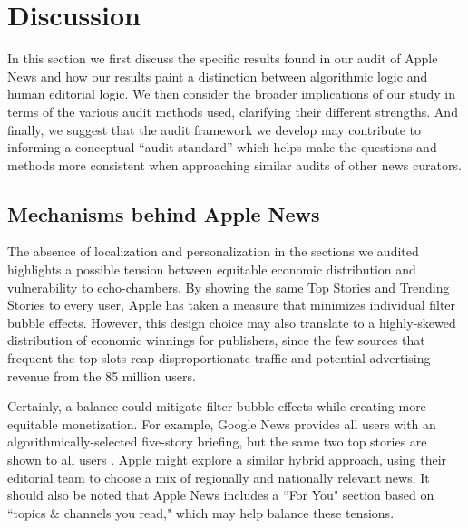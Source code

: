\section{Discussion}\label{sec:discussion}
In this section we first discuss the specific results found in our audit of Apple News and how our results paint a distinction between algorithmic logic and human editorial logic. We then consider the broader implications of our study in terms of the various audit methods used, clarifying their different strengths. And finally, we suggest that the audit framework we develop may contribute to informing a conceptual ``audit standard'' which helps make the questions and methods more consistent when approaching similar audits of other news curators. 


\subsection{Mechanisms behind Apple News}
The absence of localization and personalization in the sections we audited highlights a possible tension between equitable economic distribution and vulnerability to echo-chambers. By showing the same Top Stories and Trending Stories to every user, Apple has taken a measure that minimizes individual filter bubble effects. However, this design choice may also translate to a highly-skewed distribution of economic winnings for publishers, since the few sources that frequent the top slots reap disproportionate traffic and potential advertising revenue from the 85 million users. 

Certainly, a balance could mitigate filter bubble effects while creating more equitable monetization. For example, Google News provides all users with an algorithmically-selected five-story briefing, but the same two top stories are shown to all users \citep{Wang2018}. Apple might explore a similar hybrid approach, using their editorial team to choose a mix of regionally and nationally relevant news. It should also be noted that Apple News includes a ``For You" section based on ``topics \& channels you read," which may help balance these tensions. 


